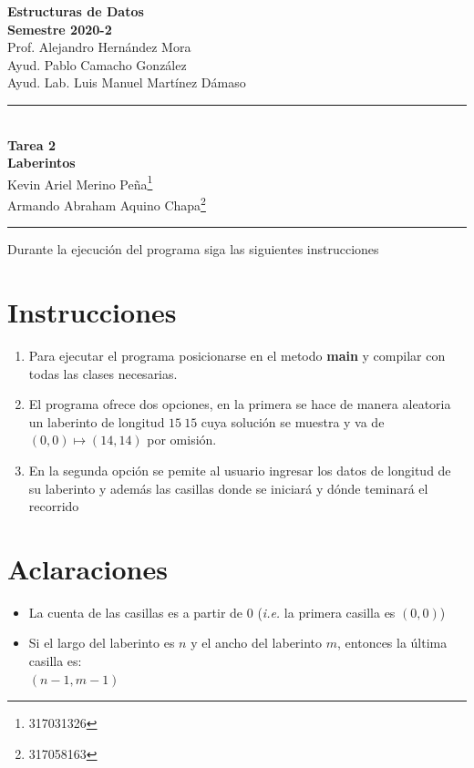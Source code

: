 \documentclass[letterpaper,11pt]{article}
\begin{document}
\begin{center}
\vspace{-134pt}
\textbf{\large Estructuras de Datos}\\[0.2cm]
\textbf{ Semestre 2020-2}\\[0.2cm]
Prof. Alejandro Hernández Mora\\[0.2cm]
Ayud. Pablo Camacho González  \\ [0.2cm]
Ayud. Lab. Luis Manuel Martínez Dámaso   \\ [0.2cm]
\rule{17cm}{0.3mm}\\
\textbf{Tarea 2}\\
\huge\textbf{Laberintos}\\[0.1cm]
\normalsize Kevin Ariel Merino Peña\footnote{317031326}\\
Armando Abraham Aquino Chapa\footnote{317058163}\\
\end{center}
\vspace{-10pt}
\rule{17cm}{0.3mm}
\begin{flushright}
\vspace{-3pt}
\end{flushright}

\noindent Durante la ejecución del programa siga las siguientes instrucciones

\section*{Instrucciones}

\begin{enumerate}

\item Para ejecutar el programa posicionarse en el metodo \textbf{main} y compilar con todas las clases necesarias.

\item El programa ofrece dos opciones, en la primera se hace de manera aleatoria un laberinto de longitud $ 15 \ 15 $ cuya solución se muestra y va de $ (0,0)  \mapsto (14,14) $ por omisión.

\item En la segunda opción se pemite al usuario ingresar los datos de longitud de su laberinto y además las casillas donde se iniciará y dónde teminará el recorrido

\end{enumerate}
\section*{Aclaraciones}
\begin{itemize}
	\item La cuenta de las casillas es a partir de 0 (\textit{i.e. } la primera casilla es $ (0,0) $) 
	\item Si el largo del laberinto es $ n $ y el ancho del laberinto $ m $, entonces la última casilla es: \\$ (n-1,m-1) $
\end{itemize}
\end{document}
